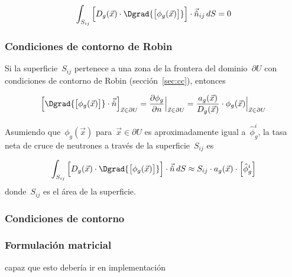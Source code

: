 \begin{equation}\label{eq:vol-tasa-cruce-derivada-nula}
\int_{S_{ij}} \Big[ D_g(\vec{x}) \cdot \Dgrad {\big[\phi_g(\vec{x})\big]} \Big] \cdot \vec{\hat{n}}_{ij} \, dS = 0
\end{equation}

\subsubsection{Condiciones de contorno de Robin} %

Si la superficie~$S_{ij}$ pertenece a una zona de la frontera del dominio~$\partial U$ con condiciones de contorno de Robin (sección~\ref{sec:cc}), entonces

\begin{equation*}
\Big[ \Dgrad {\big[\phi_g(\vec{x})\big]} \cdot \vec{\hat{n}}\Big]_{\vec{x} \in \partial U} =  \frac{\partial \phi_g}{\partial n} \Big|_{\vec{x} \in \partial U} = \frac{a_g(\vec{x})}{D_g(\vec{x})} \cdot \phi_g(\vec{x})\Big|_{\vec{x} \in \partial U}
\end{equation*}
%

Asumiendo que~$\phi_g(\vec{x})$ para~$\vec{x}\in \partial U$ es aproximadamente igual a~$\hat{\phi}_g^i$, la tasa neta de cruce de neutrones a través de la superficie~$S_{ij}$ es

\begin{equation}\label{eq:vol-tasa-cruce-robin}
\int_{S_{ij}} \Big[ D_g(\vec{x}) \cdot \Dgrad {\big[\phi_g(\vec{x})\big]} \Big] \cdot \vec{\hat{n}} \, dS \approx S_{ij} \cdot a_g(\vec{x}) \cdot \Big[ \hat{\phi}_g^i\Big]
\end{equation}
%
donde~$S_{ij}$ es el área de la superficie.

% 

\subsubsection{Condiciones de contorno} %

\subsubsection{Formulación matricial} %

capaz que esto debería ir en implementación

